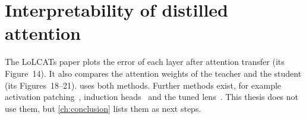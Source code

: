 \section{Interpretability of distilled attention}
\label{sec:rw-xai}

The LoLCATs paper plots the error of each layer after attention transfer (its Figure~14). It also compares the attention weights of the teacher and the student (its Figures~18--21).  uses both methods. Further methods exist, for example activation patching~\cite{heimersheim2024}, induction heads~\cite{olsson2022} and the tuned lens~\cite{belrose2023}. This thesis does not use them, but \cref{ch:conclusion} lists them as next steps.
